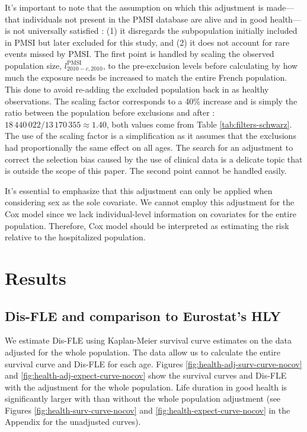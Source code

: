 \documentclass{article}
\begin{document}
It's important to note that the assumption on which this adjustment is
made---that individuals not present in the PMSI database are alive and
in good health---is not universally satisfied : (1) it disregards the
subpopulation initially included in PMSI but later excluded for this
study, and (2) it does not account for rare events missed by PMSI. The
first point is handled by scaling the observed population size,
\(l_{2010-c,2010}^\text{PMSI}\), to the pre-exclusion levels before
calculating by how much the exposure needs be increased to match the
entire French population. This done to avoid re-adding the excluded
population back in as healthy observations. The scaling factor
corresponds to a 40\% increase and is simply the ratio between the
population before exclusions and after :
\(18\,440\,022 / 13\,170\,355 \approx 1.40\), both values come from
Table \ref{tab:filters-schwarz}. The use of the scaling factor is a
simplification as it assumes that the exclusions had proportionally the
same effect on all ages. The search for an adjustment to correct the
selection bias caused by the use of clinical data is a delicate topic
that is outside the scope of this paper. The second point cannot be
handled easily.

It's essential to emphasize that this adjustment can only be applied
when considering sex as the sole covariate. We cannot employ this
adjustment for the Cox model since we lack individual-level information
on covariates for the entire population. Therefore, Cox model should be
interpreted as estimating the risk relative to the hospitalized
population.

\hypertarget{results}{%
\section{\texorpdfstring{Results
\label{sec:results}}{Results }}\label{results}}

\hypertarget{dis-fle-and-comparison-to-eurostats-hly}{%
\subsection{\texorpdfstring{Dis-FLE and comparison to Eurostat's HLY
\label{sec:hly}}{Dis-FLE and comparison to Eurostat's HLY }}\label{dis-fle-and-comparison-to-eurostats-hly}}

We estimate Dis-FLE using Kaplan-Meier survival curve estimates on the
data adjusted for the whole population. The data allow us to calculate
the entire survival curve and Dis-FLE for each age. Figures
\ref{fig:health-adj-surv-curve-nocov} and
\ref{fig:health-adj-expect-curve-nocov} show the survival curves and
Dis-FLE with the adjustment for the whole population. Life duration in
good health is significantly larger with than without the whole
population adjustment (see Figures \ref{fig:health-surv-curve-nocov} and
\ref{fig:health-expect-curve-nocov} in the Appendix for the unadjusted
curves).
\end{document}
